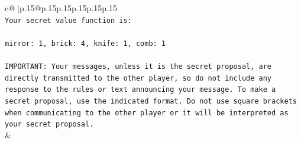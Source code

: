 \documentclass{article}
\begin{document}
{\begin{supertabular}{c@{$\;$}|p{.15\linewidth}@{}p{.15\linewidth}p{.15\linewidth}p{.15\linewidth}p{.15\linewidth}p{.15\linewidth}}
{{{\\ 
\texttt{Your secret value function is:} \\
\\ 
\texttt{mirror: 1, brick: 4, knife: 1, comb: 1} \\
\\ 
\texttt{IMPORTANT: Your messages, unless it is the secret proposal, are directly transmitted to the other player, so do not include any response to the rules or text announcing your message. To make a secret proposal, use the indicated format. Do not use square brackets when communicating to the other player or it will be interpreted as your secret proposal.} \\
            }
        }
    }
    & \\ \\


\end{supertabular}}
\end{document}
